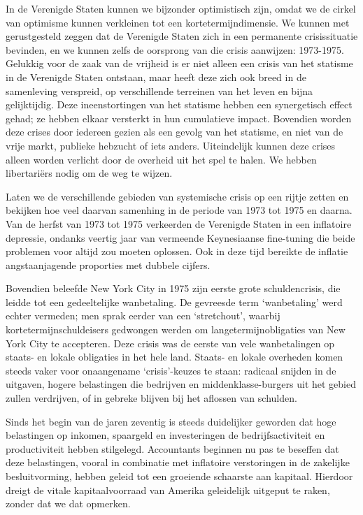 \documentclass[
  a5paper,
  smalldemyvopaper,10pt,twoside,onecolumn,openright,extrafontsizes,hidelinks]{memoir}
\begin{document}
In de Verenigde Staten kunnen we bijzonder optimistisch zijn, omdat we
de cirkel van optimisme kunnen verkleinen tot een kortetermijndimensie.
We kunnen met gerustgesteld zeggen dat de Verenigde Staten zich in een
permanente crisissituatie bevinden, en we kunnen zelfs de oorsprong van
die crisis aanwijzen: 1973-1975. Gelukkig voor de zaak van de vrijheid
is er niet alleen een crisis van het statisme in de Verenigde Staten
ontstaan, maar heeft deze zich ook breed in de samenleving verspreid, op
verschillende terreinen van het leven en bijna gelijktijdig. Deze
ineenstortingen van het statisme hebben een synergetisch effect gehad;
ze hebben elkaar versterkt in hun cumulatieve impact. Bovendien worden
deze crises door iedereen gezien als een gevolg van het statisme, en
niet van de vrije markt, publieke hebzucht of iets anders. Uiteindelijk
kunnen deze crises alleen worden verlicht door de overheid uit het spel
te halen. We hebben libertariërs nodig om de weg te wijzen.

Laten we de verschillende gebieden van systemische crisis op een rijtje
zetten en bekijken hoe veel daarvan samenhing in de periode van 1973 tot
1975 en daarna. Van de herfst van 1973 tot 1975 verkeerden de Verenigde
Staten in een inflatoire depressie, ondanks veertig jaar van vermeende
Keynesiaanse fine-tuning die beide problemen voor altijd zou moeten
oplossen. Ook in deze tijd bereikte de inflatie angstaanjagende
proporties met dubbele cijfers.

Bovendien beleefde New York City in 1975 zijn eerste grote
schuldencrisis, die leidde tot een gedeeltelijke wanbetaling. De
gevreesde term `wanbetaling' werd echter vermeden; men sprak eerder van
een `stretchout', waarbij kortetermijnschuldeisers gedwongen werden om
langetermijnobligaties van New York City te accepteren. Deze crisis was
de eerste van vele wanbetalingen op staats- en lokale obligaties in het
hele land. Staats- en lokale overheden komen steeds vaker voor
onaangename `crisis'-keuzes te staan: radicaal snijden in de uitgaven,
hogere belastingen die bedrijven en middenklasse-burgers uit het gebied
zullen verdrijven, of in gebreke blijven bij het aflossen van schulden.

Sinds het begin van de jaren zeventig is steeds duidelijker geworden dat
hoge belastingen op inkomen, spaargeld en investeringen de
bedrijfsactiviteit en productiviteit hebben stilgelegd. Accountants
beginnen nu pas te beseffen dat deze belastingen, vooral in combinatie
met inflatoire verstoringen in de zakelijke besluitvorming, hebben
geleid tot een groeiende schaarste aan kapitaal. Hierdoor dreigt de
vitale kapitaalvoorraad van Amerika geleidelijk uitgeput te raken,
zonder dat we dat opmerken.
\end{document}
